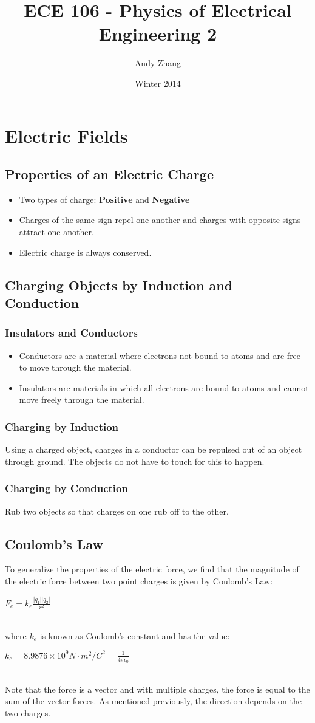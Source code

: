 \documentclass[12pt]{report}
\title{ECE 106 - Physics of Electrical Engineering 2}
\author{Andy Zhang}
\date{Winter 2014}
\begin{document}
\maketitle
\tableofcontents
\chapter{Electric Fields}
	\section{Properties of an Electric Charge}
		\begin{itemize}
			\item Two types of charge: \textbf{Positive} and \textbf{Negative}
			\item Charges of the same sign repel one another and charges with opposite signs attract one another.
			\item Electric charge is always conserved.
		\end{itemize}
	\section{Charging Objects by Induction and Conduction}
		\subsection{Insulators and Conductors}
		\begin{itemize}
			\item Conductors are a material where electrons not bound to atoms and are free to move through the material.
			\item Insulators are materials in which all electrons are bound to atoms and cannot move freely through the material.
		\end{itemize}
		\subsection{Charging by Induction}
			Using a charged object, charges in a conductor can be repulsed out of an object through ground. The objects do not have to touch for this to happen.
		\subsection{Charging by Conduction}
			Rub two objects so that charges on one rub off to the other.
	\section{Coulomb's Law}
		To generalize the properties of the electric force, we find that the magnitude of the electric force between two point charges is given by Coulomb's Law:\\
		\centerline{$F_e = k_e \frac{|q_1||q_2|}{r^2}$}\\
		where $k_e$ is known as Coulomb's constant and has the value:\\
		\centerline{$k_e = 8.9876 \times 10^9 N \cdot m^2/C^2 = \frac{1}{4\pi \epsilon_0}$ }\\
		Note that the force is a vector and with multiple charges, the force is equal to the sum of the vector forces. As mentioned previously, the direction depends on the two charges.
\end{document}
